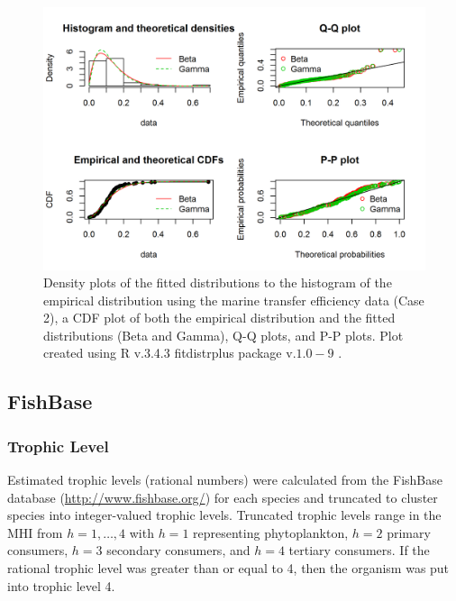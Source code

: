 \documentclass[oneside,12pt,final]{sty/ucthesis-CA2012}
\let\cite\citep                             %
\begin{document}
\begin{mainmatter}
\begin{figure}[H]
     \centering
       \includegraphics[width=.8\textwidth]{fig/gof_te}
    \caption{Density plots of the fitted distributions to the histogram of the empirical distribution using the marine transfer efficiency data (Case 2), a CDF plot of both the empirical distribution and the fitted distributions (Beta and Gamma), Q-Q plots, and P-P plots. Plot created using R v.3.4.3 \cite{Rcite} fitdistrplus package v.$1.0-9$ \cite{fitdistrplus}. }
    \label{gof_te_a3}
\end{figure}


\subsection{FishBase}
\subsubsection{Trophic Level}
Estimated trophic levels (rational numbers) were calculated from the FishBase database (\url{http://www.fishbase.org/}) for each species and truncated to cluster species into integer-valued trophic levels. Truncated trophic levels range in the MHI from $h=1,\dots,4$ with $h=1$ representing phytoplankton, $h=2$ primary consumers, $h=3$ secondary consumers, and $h=4$ tertiary consumers. If the rational trophic level was greater than or equal to 4, then the organism was put into trophic level 4. 



\end{mainmatter}
\end{document}
